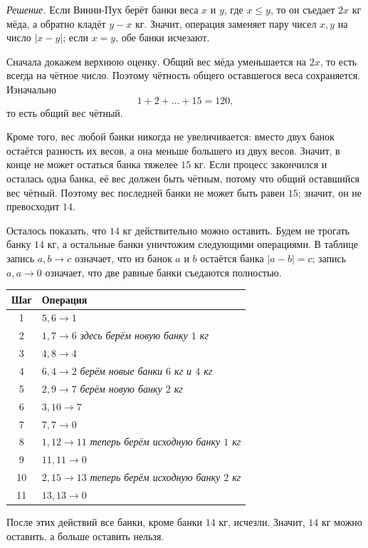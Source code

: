 \textit{Решение.}
Если Винни-Пух берёт банки веса $x$ и $y$, где $x\le y$, то он съедает $2x$ кг мёда, а обратно кладёт $y-x$ кг. Значит, операция заменяет пару чисел $x,y$ на число $|x-y|$; если $x=y$, обе банки исчезают.

Сначала докажем верхнюю оценку. Общий вес мёда уменьшается на $2x$, то есть всегда на чётное число. Поэтому чётность общего оставшегося веса сохраняется. Изначально
\[
1+2+\ldots+15=120,
\]
то есть общий вес чётный.

Кроме того, вес любой банки никогда не увеличивается: вместо двух банок остаётся разность их весов, а она меньше большего из двух весов. Значит, в конце не может остаться банка тяжелее $15$ кг. Если процесс закончился и осталась одна банка, её вес должен быть чётным, потому что общий оставшийся вес чётный. Поэтому вес последней банки не может быть равен $15$; значит, он не превосходит $14$.

Осталось показать, что $14$ кг действительно можно оставить. Будем не трогать банку $14$ кг, а остальные банки уничтожим следующими операциями. В таблице запись $a,b\to c$ означает, что из банок $a$ и $b$ остаётся банка $|a-b|=c$; запись $a,a\to0$ означает, что две равные банки съедаются полностью.

\begin{center}
\begin{tabular}{c>{\centering\arraybackslash}p{8.5cm}}
\toprule
Шаг & Операция \\
\midrule
1 & $5,6\to1$ \\
2 & $1,7\to6$ \quad\textit{здесь берём новую банку $1$ кг} \\
3 & $4,8\to4$ \\
4 & $6,4\to2$ \quad\textit{берём новые банки $6$ кг и $4$ кг} \\
5 & $2,9\to7$ \quad\textit{берём новую банку $2$ кг} \\
6 & $3,10\to7$ \\
7 & $7,7\to0$ \\
8 & $1,12\to11$ \quad\textit{теперь берём исходную банку $1$ кг} \\
9 & $11,11\to0$ \\
10 & $2,15\to13$ \quad\textit{теперь берём исходную банку $2$ кг} \\
11 & $13,13\to0$ \\
\bottomrule
\end{tabular}
\end{center}

После этих действий все банки, кроме банки $14$ кг, исчезли. Значит, $14$ кг можно оставить, а больше оставить нельзя.

